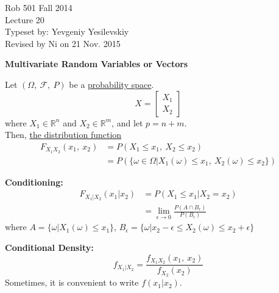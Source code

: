 \documentclass[letterpaper]{article}
\begin{document}
\baselineskip=48pt  %


\setlength{\parskip}{.3in}
\setlength{\itemsep}{.3in}

\pagestyle{plain}

{\Large \bf
\begin{center}
Rob 501 Fall 2014\\
Lecture 20\\
Typeset by:  Yevgeniy Yesilevskiy\\
Revised by Ni on 21 Nov. 2015
\end{center}
}

\Large

\begin{center}
    \textbf{Multivariate Random Variables or Vectors}
\end{center}

\noindent Let $(\Omega,\ \mathscr{F},\ P)$ be a \underline{probability space}.
    \begin{equation*}
        X = \begin{bmatrix}
            X_1\\
            X_2
        \end{bmatrix}
    \end{equation*}
    where $X_1\in\mathbb{R}^n$ and $X_2\in\mathbb{R}^m$, and let $p=n+m$.\\
    Then, \underline{the distribution function}
    \begin{align*}
        F_{X_1X_2}(x_1,\ x_2)&=P(X_1\leq x_1,\ X_2\leq x_2)\\
        &=P(\{\omega\in\Omega|X_1(\omega)\leq x_1,\ X_2(\omega)\leq x_2\})
    \end{align*}

\noindent \textbf{Conditioning:}
    \begin{align*}
        F_{X_1|X_2}(x_1|x_2)&=P(X_1\leq x_1|X_2=x_2)\\
        &=\lim_{\epsilon\rightarrow 0}\frac{P(A\cap B_\epsilon)}{P(B_\epsilon)}
    \end{align*}
    where $A=\{\omega|X_1(\omega)\leq x_1\}$, $B_\epsilon=\{\omega|x_2-\epsilon\leq X_2(\omega)\leq x_2+\epsilon\}$

\noindent \textbf{Conditional Density:}
    \begin{equation*}
        f_{X_1|X_2}=\frac{f_{X_1X_2}(x_1,\ x_2)}{f_{X_2}(x_2)}
    \end{equation*}
    Sometimes, it is convenient to write $f(x_1|x_2)$.
\end{document}

